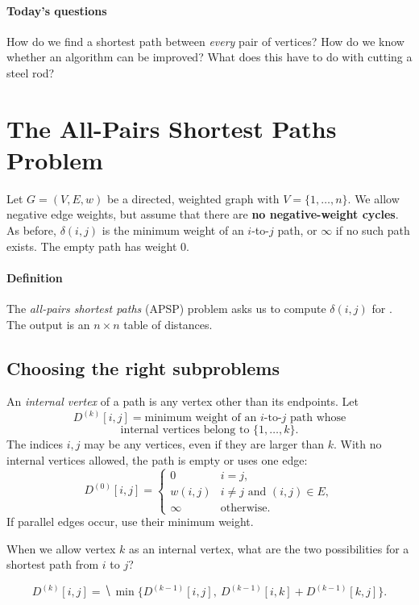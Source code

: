 \documentclass[11  pt]{article}
\begin{document}

\paragraph{Today's questions}
How do we find a shortest path between \emph{every} pair of vertices?
How do we know whether an algorithm can be improved?
What does this have to do with cutting a steel rod?

\section{The All-Pairs Shortest Paths Problem}
Let $G=(V,E,w)$ be a directed, weighted graph with $V=\{1,\ldots,n\}$.
We allow negative edge weights, but assume that there are \textbf{no negative-weight cycles}.
As before, $\delta(i,j)$ is the minimum weight of an $i$-to-$j$ path,
or $\infty$ if no such path exists. The empty path has weight $0$.

\paragraph{Definition}
The \emph{all-pairs shortest paths} (APSP) problem asks us to compute
$\delta(i,j)$ for .
The output is an $n\times n$ table of distances.

\subsection{Choosing the right subproblems}
An \emph{internal vertex} of a path is any vertex other than its endpoints.
Let
\[
 D^{(k)}[i,j]=\text{minimum weight of an $i$-to-$j$ path whose}
\]
\[
 \text{internal vertices belong to $\{1,\ldots,k\}$.}
\]
The indices $i,j$ may be any vertices, even if they are larger than $k$.
With no internal vertices allowed, the path is empty or uses one edge:
\[
 D^{(0)}[i,j]=
 \begin{cases}
  0 & i=j,\\
  w(i,j) & i\ne j\text{ and }(i,j)\in E,\\
  \infty & \text{otherwise.}
 \end{cases}
\]
If parallel edges occur, use their minimum weight.

\begin{Qu}
When we allow vertex $k$ as an internal vertex, what are the two possibilities
for a shortest path from $i$ to $j$?
\end{Qu}
\vspace{2in}
\[
\boxed{D^{(k)}[i,j]=\hide{\min\bigl\{D^{(k-1)}[i,j],\ D^{(k-1)}[i,k]+D^{(k-1)}[k,j]\bigr\}.}}
\]
\end{document}
